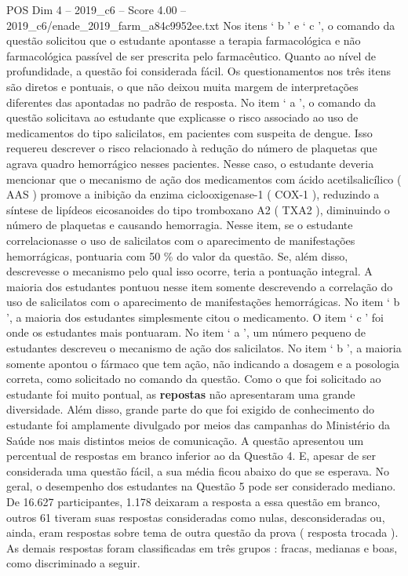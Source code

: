 \begin{textsample}{POS Dim 4 – 2019\_c6 – Score 4.00 – 2019\_c6/enade\_2019\_farm\_a84c9952ee.txt}
Nos itens ‘ b ’ e ‘ c ’, o comando da questão solicitou que o estudante apontasse a terapia farmacológica e não farmacológica passível de ser prescrita pelo farmacêutico.
Quanto ao nível de profundidade, a questão foi considerada fácil.
Os questionamentos nos três itens são diretos e pontuais, o que não deixou muita margem de interpretações diferentes das apontadas no padrão de resposta.
No item ‘ a ’, o comando da questão solicitava ao estudante que explicasse o risco associado ao uso de medicamentos do tipo salicilatos, em pacientes com suspeita de dengue.
Isso requereu descrever o risco relacionado à redução do número de plaquetas que agrava quadro hemorrágico nesses pacientes.
Nesse caso, o estudante deveria mencionar que o mecanismo de ação dos medicamentos com ácido acetilsalicílico ( AAS ) promove a inibição da enzima ciclooxigenase-1 ( COX-1 ), reduzindo a síntese de lipídeos eicosanoides do tipo tromboxano A2 ( TXA2 ), diminuindo o número de plaquetas e causando hemorragia.
Nesse item, se o estudante correlacionasse o uso de salicilatos com o aparecimento de manifestações hemorrágicas, pontuaria com 50 \% do valor da questão.
Se, além disso, descrevesse o mecanismo pelo qual isso ocorre, teria a pontuação integral.
A maioria dos estudantes pontuou nesse item somente descrevendo a correlação do uso de salicilatos com o aparecimento de manifestações hemorrágicas.
No item ‘ b ’, a maioria dos estudantes simplesmente citou o medicamento.
O item ‘ c ’ foi onde os estudantes mais pontuaram.
No item ‘ a ’, um número pequeno de estudantes descreveu o mecanismo de ação dos salicilatos.
No item ‘ b ’, a maioria somente apontou o fármaco que tem ação, não indicando a dosagem e a posologia correta, como solicitado no comando da questão.
Como o que foi solicitado ao estudante foi muito pontual, as \textbf{repostas} não apresentaram uma grande diversidade.
Além disso, grande parte do que foi exigido de conhecimento do estudante foi amplamente divulgado por meios das campanhas do Ministério da Saúde nos mais distintos meios de comunicação.
A questão apresentou um percentual de respostas em branco inferior ao da Questão 4.
E, apesar de ser considerada uma questão fácil, a sua média ficou abaixo do que se esperava.
No geral, o desempenho dos estudantes na Questão 5 pode ser considerado mediano.
De 16.627 participantes, 1.178 deixaram a resposta a essa questão em branco, outros 61 tiveram suas respostas consideradas como nulas, desconsideradas ou, ainda, eram respostas sobre tema de outra questão da prova ( resposta trocada ).
As demais respostas foram classificadas em três grupos : fracas, medianas e boas, como discriminado a seguir.

\end{textsample}
